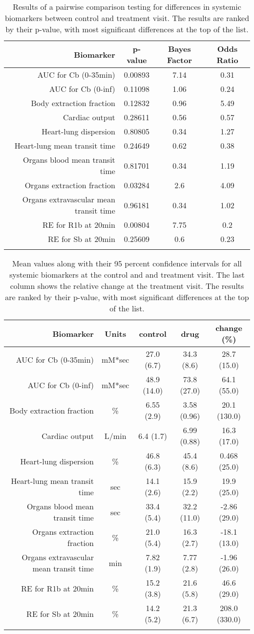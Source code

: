 \documentclass{epflreport}%
\begin{document}
%
\begin{longtable}{rccc}%
\hline%
Biomarker&p{-}value&Bayes Factor&Odds Ratio\\%
\hline%
AUC for Cb (0{-}35min)&0.00893&7.14&0.31\\%
AUC for Cb (0{-}inf)&0.11098&1.06&0.24\\%
Body extraction fraction&0.12832&0.96&5.49\\%
Cardiac output&0.28611&0.56&0.57\\%
Heart{-}lung dispersion&0.80805&0.34&1.27\\%
Heart{-}lung mean transit time&0.24649&0.62&0.38\\%
Organs blood mean transit time&0.81701&0.34&1.19\\%
Organs extraction fraction&0.03284&2.6&4.09\\%
Organs extravascular mean transit time&0.96181&0.34&1.02\\%
RE for R1b at 20min&0.00804&7.75&0.2\\%
RE for Sb at 20min&0.25609&0.6&0.23\\%
\hline%
\caption{Results of a pairwise comparison testing for differences in systemic biomarkers between control and treatment visit. The results are ranked by their p-value, with most significant differences at the top of the list.} \\%
\end{longtable}%
\begin{longtable}{rcccc}%
\hline%
Biomarker&Units&control&drug&change (\%)\\%
\hline%
AUC for Cb (0{-}35min)&mM*sec&27.0 (6.7) &34.3 (8.6) &28.7 (15.0) \\%
AUC for Cb (0{-}inf)&mM*sec&48.9 (14.0) &73.8 (27.0) &64.1 (55.0) \\%
Body extraction fraction&\%&6.55 (2.9) &3.58 (0.96) &20.1 (130.0) \\%
Cardiac output&L/min&6.4 (1.7) &6.99 (0.88) &16.3 (17.0) \\%
Heart{-}lung dispersion&\%&46.8 (6.3) &45.4 (8.6) &0.468 (25.0) \\%
Heart{-}lung mean transit time&sec&14.1 (2.6) &15.9 (2.2) &19.9 (25.0) \\%
Organs blood mean transit time&sec&33.4 (5.4) &32.2 (11.0) &{-}2.86 (29.0) \\%
Organs extraction fraction&\%&21.0 (5.4) &16.3 (2.7) &{-}18.1 (13.0) \\%
Organs extravascular mean transit time&min&7.82 (1.9) &7.77 (2.8) &{-}1.96 (26.0) \\%
RE for R1b at 20min&\%&15.2 (3.8) &21.6 (5.8) &46.6 (29.0) \\%
RE for Sb at 20min&\%&14.2 (5.2) &21.3 (6.7) &208.0 (330.0) \\%
\hline%
\caption{Mean values along with their 95 percent confidence intervals for all systemic biomarkers at the control and and treatment visit. The last column shows the relative change at the treatment visit. The results are ranked by their p-value, with most significant differences at the top of the list.} \\%
\end{longtable}%
\clearpage%
\end{document}
